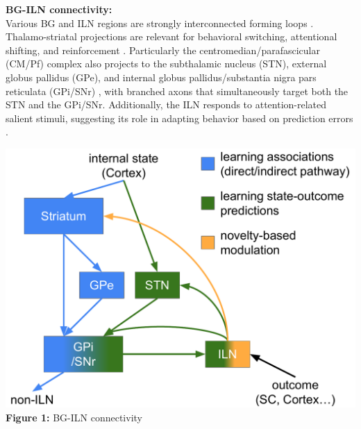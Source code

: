 \documentclass[portrait,final,a0paper,fontscale=0.30]{baposter}
\begin{document}
\begin{poster}
{\begin{adjustbox}{minipage=\textwidth, margin=2pt, center}
\begin{minipage}{0.24\textwidth}
        \textbf{BG-ILN connectivity:}\\
        Various BG and ILN regions are strongly interconnected forming loops \parencite{cover_rostral_2021, gonzalo-martin_micropopulation_2024, smith_thalamostriatal_2014}. Thalamo-striatal projections are relevant for behavioral switching, attentional shifting, and reinforcement \parencite{smith_thalamostriatal_2014,cover_activation_2019, cover_rostral_2023}. Particularly the centromedian/parafascicular (CM/Pf) complex also projects to the subthalamic nucleus (STN), external globus pallidus (GPe), and internal globus pallidus/substantia nigra pars reticulata (GPi/SNr) \parencite{gonzalo-martin_micropopulation_2024,castle_thalamic_2005,kita_intralaminar_2016,hanini-daoud_processing_2022}, with branched axons that simultaneously target both the STN and the GPi/SNr. Additionally, the ILN responds to attention-related salient stimuli, suggesting its role in adapting behavior based on prediction errors \parencite{minamimoto_participation_2002,smith_thalamostriatal_2014}.
    \end{minipage}
    \hspace{0.01\textwidth}
    \begin{minipage}{0.25\textwidth}
        \centering
        \includegraphics[width=\textwidth]{figures/circuit_idea_1.pdf}
        \textbf{Figure 1:} BG-ILN connectivity
    \end{minipage}
    \hspace{0.01\textwidth}
    \begin{minipage}{0.25\textwidth}
        \centering

\end{minipage}
\end{adjustbox}}
\end{poster}
\end{document}
